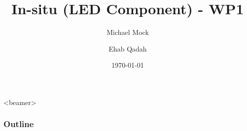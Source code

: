 \documentclass{beamer}
\title{In-situ (LED Component) - WP1}
\author[shortname]{Michael Mock \inst{*} \and Ehab Qadah  \inst{*}}
\institute[shortinst]{\inst{*} Fraunhofer IAIS, Germany \and %
}
\date{\today}
\begin{document}
	
	\frame{\titlepage}

	
	\begin{frame}<beamer>
		\frametitle{Outline}
		\tableofcontents
	\end{frame}
	

	
\end{document}
